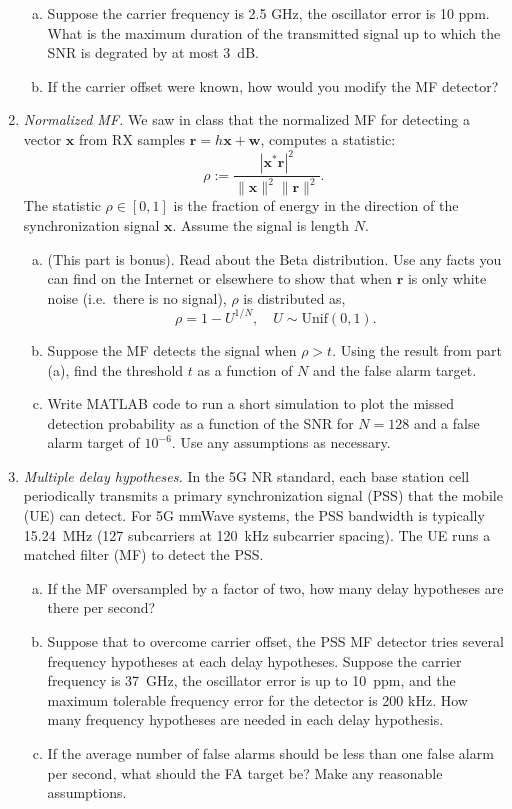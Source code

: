 \documentclass[11pt]{article}
\newcommand{\rbf}{\mathbf{r}}
\newcommand{\wbf}{\mathbf{w}}
\newcommand{\xbf}{\mathbf{x}}
\begin{document}
\begin{enumerate}
\begin{enumerate}[(a)]
\item Suppose the carrier frequency is 2.5 GHz,  the oscillator error is
10 ppm.  What is the maximum duration of the transmitted signal up to which
the SNR is degrated by at most 3~dB.

\item If the carrier offset were known, how would you modify the MF
detector?
\end{enumerate}

\item \emph{Normalized MF.}  We saw in class that the normalized MF
for detecting a vector
$\xbf$ from RX samples $\rbf = h\xbf + \wbf$, computes a statistic:
\[
    \rho := \frac{|\xbf^*\rbf|^2}{\|\xbf\|^2\|\rbf\|^2}.
\]
The statistic $\rho \in [0,1]$ is the fraction of energy in the direction
of the synchronization signal $\xbf$.  
Assume the signal is length $N$.
\begin{enumerate}[(a)]
\item   (This part is bonus).
Read about the Beta distribution.  Use any facts you can find
on the Internet or elsewhere to show that when
$\rbf$ is only white noise (i.e.\ there is no signal), $\rho$ is 
distributed as,
\[
    \rho = 1-U^{1/N},  \quad U \sim \mathrm{Unif}(0,1).
\]

\item Suppose the MF detects the signal when $\rho > t$.
Using the result from part (a), find the threshold $t$ as a function
of $N$ and the false alarm target.

\item Write MATLAB code to run a short simulation to plot the 
missed detection probability as a function of the SNR for $N=128$
and a false alarm target of $10^{-6}$.  Use any assumptions as necessary.
\end{enumerate}

\item \emph{Multiple delay hypotheses.} 
In the 5G NR standard, each base station cell periodically transmits a
primary synchronization signal (PSS) that the mobile (UE) can detect.
For 5G mmWave systems, the PSS bandwidth is typically
15.24~MHz (127 subcarriers at 120~kHz subcarrier spacing).  
The UE runs a matched filter (MF) to detect the PSS.
\begin{enumerate}[(a)]
\item If the MF oversampled by a factor of two, how many delay hypotheses
are there per second?

\item Suppose that to overcome carrier offset, the PSS MF detector
tries several frequency hypotheses at each delay hypotheses.
Suppose the carrier frequency is 37~GHz, the oscillator error is up to 10~ppm,
and the maximum tolerable frequency error for the detector is 200 kHz.
How many frequency hypotheses are needed in each delay hypothesis.

\item If the average number of false alarms should be less than one
false alarm per second, what should the FA target be?
Make any reasonable assumptions.
\end{enumerate}


\end{enumerate}
\end{document}
